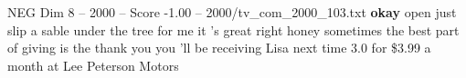 \begin{textsample}{NEG Dim 8 – 2000 – Score -1.00 – 2000/tv\_com\_2000\_103.txt}  \label{ex:f8_neg_064}
\textbf{okay} open just slip a sable under the tree for me it 's great right honey sometimes the best part of giving is the thank you you 'll be receiving Lisa next time 3.0 for \$3.99 a month at Lee Peterson Motors

\end{textsample}
